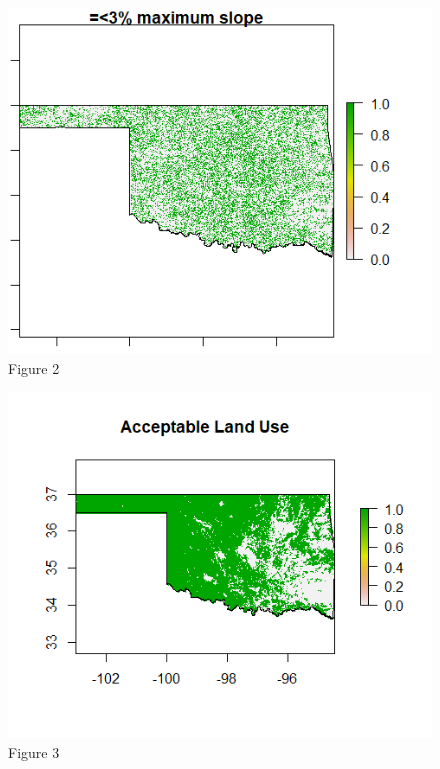 \documentclass[12pt,english]{article}
\begin{document}



\begin{figure}[ht!]

\centering

\bigskip{}

\includegraphics[width=.9\linewidth]{Rslope2.png}

\caption{Figure 2}

\label{fig:fig2}

\end{figure}




\begin{figure}[ht!]

\centering

\bigskip{}

\includegraphics[width=.9\linewidth]{Rlanduse3.png}

\caption{Figure 3}

\label{fig:fig3}

\end{figure}
\end{document}
